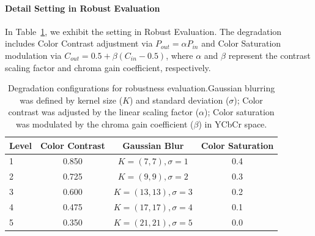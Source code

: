 \documentclass{article}
\theoremstyle{plain}
\theoremstyle{definition}
\theoremstyle{remark}
\begin{document}
\paragraph{Detail Setting in Robust Evaluation}
In Table~\ref{tab:degradation}, we exhibit the setting in Robust Evaluation.
The degradation includes Color Contrast adjustment via $P_{out} = \alpha P_{in}$ and Color Saturation modulation via $C_{out} = 0.5 + \beta (C_{in} - 0.5)$, where $\alpha$ and $\beta$ represent the contrast scaling factor and chroma gain coefficient, respectively.
\begin{table}[h]
\centering
\scriptsize
\caption{Degradation configurations for robustness evaluation.Gaussian blurring was defined by kernel size ($K$) and standard deviation ($\sigma$); Color contrast was adjusted by the linear scaling factor ($\alpha$); Color saturation was modulated by the chroma gain coefficient ($\beta$) in YCbCr space.}
\label{tab:degradation}
\setlength{\tabcolsep}{16pt}
\begin{tabular}{l|ccc}
\toprule
\textbf{Level} & \textbf{Color Contrast} & \textbf{Gaussian Blur} & \textbf{Color Saturation} \\
\midrule
1 & 0.850 & $K=(7,7), \sigma=1$ & 0.4 \\
2 & 0.725 & $K=(9,9), \sigma=2$ & 0.3 \\
3 & 0.600 & $K=(13,13), \sigma=3$ & 0.2 \\
4 & 0.475 & $K=(17,17), \sigma=4$ & 0.1 \\
5 & 0.350 & $K=(21,21), \sigma=5$ & 0.0 \\
\bottomrule
\end{tabular}
\end{table}
\end{document}
